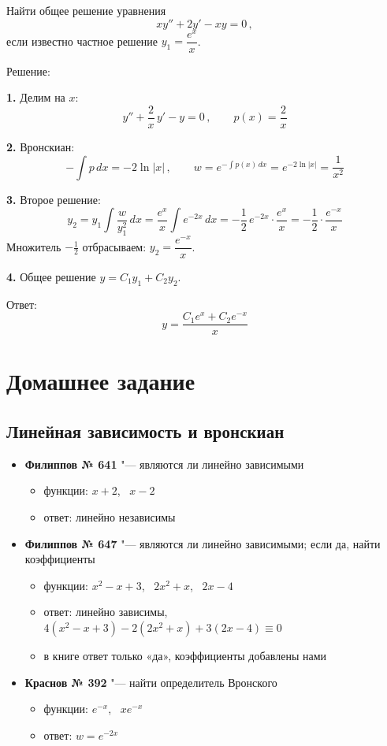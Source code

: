 \documentclass[11pt,a4paper]{article}
\begin{document}
Найти общее решение уравнения
\[
  x y'' + 2y' - x y = 0\,,
\]
если известно частное решение $y_1 = \dfrac{e^{x}}{x}$.

Решение:

\textbf{1.} Делим на $x$:
\[
  y'' + \frac{2}{x}\, y' - y = 0\,, \qquad p(x) = \frac{2}{x}
\]

\textbf{2.} Вронскиан:
\[
  -\int p\,dx = -2\ln|x|\,, \qquad
  w = e^{-\int p(x)\,dx} = e^{-2\ln|x|} = \frac{1}{x^2}
\]

\textbf{3.} Второе решение:
\[
  y_2 = y_1 \int \frac{w}{y_1^2}\,dx = \dfrac{e^{x}}{x} \int e^{-2x}\,dx= -\frac12\, e^{-2x} \cdot \frac{e^{x}}{x} = -\frac12 \cdot \frac{e^{-x}}{x}
\]
Множитель $-\frac12$ отбрасываем: $y_2 = \dfrac{e^{-x}}{x}$.

\textbf{4.} Общее решение $y = C_1 y_1 + C_2 y_2$.

Ответ:
\[
  y = \frac{C_1 e^{x} + C_2 e^{-x}}{x}
\]


\section*{Домашнее задание}

\subsection*{Линейная зависимость и вронскиан}
\begin{itemize}[topsep=2pt]
  \item \textbf{Филиппов № 641} "--- являются ли линейно зависимыми
  \begin{itemize}
    \item функции: $x + 2$, \ $x - 2$
    \item ответ: линейно независимы
  \end{itemize}
  \item \textbf{Филиппов № 647} "--- являются ли линейно зависимыми; если да, найти коэффициенты
  \begin{itemize}
    \item функции: $x^2 - x + 3$, \ $2x^2 + x$, \ $2x - 4$
    \item ответ: линейно зависимы, $4(x^2 - x + 3) - 2(2x^2 + x) + 3(2x - 4) \equiv 0$
    \item в книге ответ только «да», коэффициенты добавлены нами
  \end{itemize}
  \item \textbf{Краснов № 392} "--- найти определитель Вронского
  \begin{itemize}
    \item функции: $e^{-x}$, \ $x e^{-x}$
    \item ответ: $w = e^{-2x}$
  \end{itemize}
\end{itemize}
\end{document}
